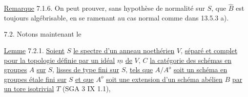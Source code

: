 \uline{Remarque} 7.1.6. On peut prouver, sans hypothèse de normalité sur $S$, que $\hat B$ est toujours algébrisable, en se ramenant au cas normal comme dans 13.5.3 a).

7.2. Notons maintenant le

\uline{Lemme} 7.2.1. \uline{Soient} $S$ \uline{le spectre d'un anneau noethérien} $V$, \uline{séparé et complet pour la topologie définie par un idéal} $\underline m$ \uline{de} $V$, $C$ \uline{la catégorie des schémas en groupes} $A$ \uline{sur} $S$, \uline{lisses de type fini sur} $S$, \uline{tels que} $A/A^o$ \uline{soit un schéma en groupes étale fini sur} $S$ \uline{et que} $A^o$ \uline{soit une extension d'un schéma abélien} $B$ \uline{par un tore isotrivial} $T$ (SGA 3 IX 1.1),


